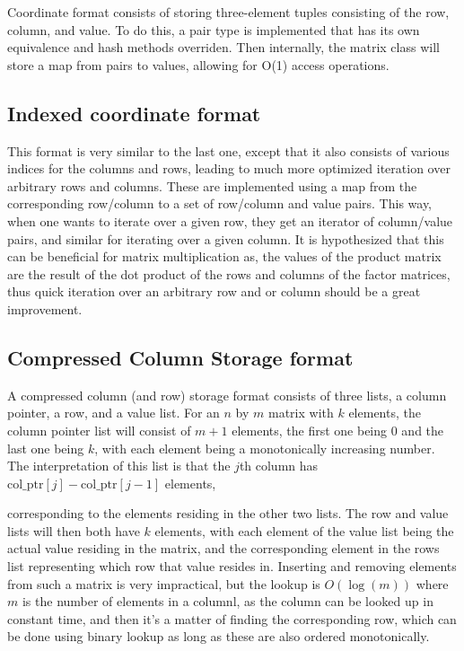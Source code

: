 \documentclass{article}
\begin{document}
Coordinate format consists of storing three-element tuples consisting of the row, column, and value.
To do this, a pair type is implemented that has its own equivalence and hash methods overriden.
Then internally, the matrix class will store a map from pairs to values, allowing for O(1) access operations.

\subsection{Indexed coordinate format}

This format is very similar to the last one, except that it also consists of various indices for the columns and rows,
leading to much more optimized iteration over arbitrary rows and columns.
These are implemented using a map from the corresponding row/column to a set of row/column and value pairs.
This way, when one wants to iterate over a given row, they get an iterator of column/value pairs, and similar
for iterating over a given column.
It is hypothesized that this can be beneficial for matrix multiplication as, the values of the product matrix are the result of the dot product of the rows
and columns of the factor matrices, thus quick iteration over an arbitrary row and or column should be a great improvement.

\subsection{Compressed Column Storage format}

A compressed column (and row) storage format consists of three lists,
a column pointer, a row, and a value list.
For an $n$ by $m$ matrix with $k$ elements,
the column pointer list will consist of $m+1$ elements, the first one being 0
and the last one being $k$, with each element being a monotonically increasing number.
The interpretation of this list is that the $j$th column has $\text{col\_ptr} [j] - \text{col\_ptr} [j-1]$ elements,

corresponding to the elements residing in the other two lists.
The row and value lists will then both have $k$ elements, with each element of the value list being the actual
value residing in the matrix, and the corresponding element in the rows list representing which row that value resides in.
Inserting and removing elements from such a matrix is very impractical, but the lookup is $O(\log(m))$ 
where $m$ is the number of elements in a columnl, as the column can be looked up in constant time,
and then it's a matter of finding the corresponding row, which can be done using binary lookup as long as these are also
ordered monotonically.
\end{document}
